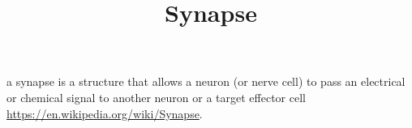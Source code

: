 \documentclass[a4paper]{article}
\title{Synapse}
\date{}
\begin{document}
    \maketitle
    a synapse is a structure that allows a neuron (or nerve cell) to pass an electrical or chemical signal to another neuron or a target effector cell \url{https://en.wikipedia.org/wiki/Synapse}.
\end{document}
